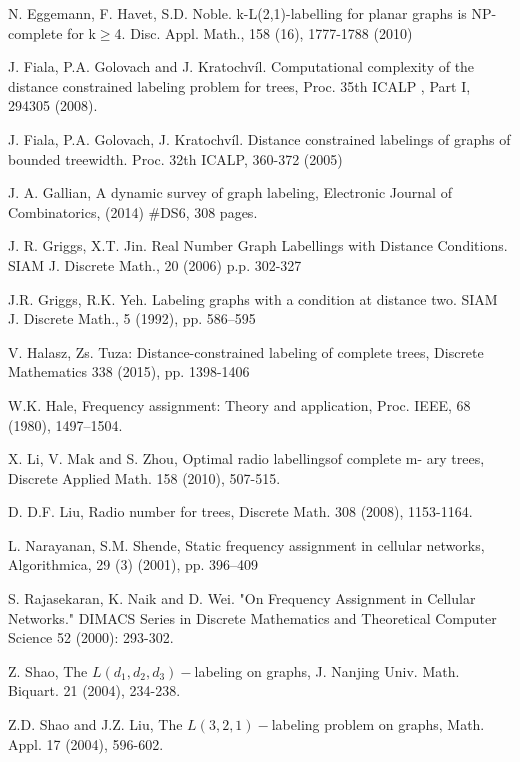 \documentclass[smallextended]{svjour3}
\begin{document}
\begin{thebibliography}{1}
N. Eggemann, F. Havet, S.D. Noble. k-L(2,1)-labelling 
for planar graphs is NP-complete for k$\geq$4. Disc. Appl. Math., 
158 (16), 1777-1788 (2010) 

 J. Fiala, P.A. Golovach and J. Kratochvíl. Computational 
complexity of the distance constrained labeling problem for trees, 
Proc. 35th ICALP , Part I, 294\textendash{}305 (2008). 

J. Fiala, P.A. Golovach, J. Kratochvíl. Distance 
constrained labelings of graphs of bounded treewidth. Proc. 32th ICALP, 
360-372 (2005) 


J. A. Gallian, A dynamic survey of graph labeling, Electronic Journal of Combinatorics, (2014) \#DS6, 308 pages. 

J. R. Griggs, X.T. Jin. Real Number Graph Labellings with Distance Conditions. 
SIAM J. Discrete Math., 20 (2006) p.p. 302-327 

J.R. Griggs, R.K. Yeh. Labeling graphs with a condition 
at distance two. SIAM J. Discrete Math., 5 (1992), pp. 586--595 

V. Halasz, Zs. Tuza: Distance-constrained labeling of complete trees, Discrete Mathematics 338 (2015), pp. 1398-1406

W.K. Hale, Frequency assignment: Theory and application, 
Proc. IEEE, 68 (1980), 1497--1504. 

X. Li, V. Mak and S. Zhou, Optimal radio labellingsof complete m-
 ary trees, Discrete Applied Math. 158 (2010), 507-515.

D. D.F. Liu, Radio number for trees, Discrete Math. 308 (2008), 1153-1164.

L. Narayanan, S.M. Shende, Static frequency assignment in cellular networks, Algorithmica, 29 (3) (2001), pp. 396–409

S. Rajasekaran, K. Naik and D. Wei. "On Frequency Assignment in Cellular Networks." DIMACS Series in Discrete Mathematics and Theoretical Computer Science 52 (2000): 293-302.

Z. Shao, The $L(d_{1},d_{2},d_{3})-$labeling on 
graphs, J. Nanjing Univ. Math. Biquart. 21 (2004), 234-238. 

Z.D. Shao and J.Z. Liu, The $L(3,2,1)-$labeling 
problem on graphs, Math. Appl. 17 (2004), 596-602. 



\end{thebibliography} 
\end{document}
